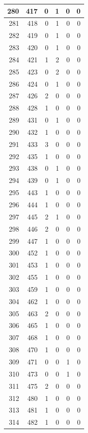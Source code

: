 \documentclass[
  letterpaper,
  DIV=11,
  numbers=noendperiod]{scrreprt}
\begin{document}
\begin{tabular}{r|r|r|r|r|r}
\hline
280 & 417 & 0 & 1 & 0 & 0\\
\hline
281 & 418 & 0 & 1 & 0 & 0\\
\hline
282 & 419 & 0 & 1 & 0 & 0\\
\hline
283 & 420 & 0 & 1 & 0 & 0\\
\hline
284 & 421 & 1 & 2 & 0 & 0\\
\hline
285 & 423 & 0 & 2 & 0 & 0\\
\hline
286 & 424 & 0 & 1 & 0 & 0\\
\hline
287 & 426 & 2 & 0 & 0 & 0\\
\hline
288 & 428 & 1 & 0 & 0 & 0\\
\hline
289 & 431 & 0 & 1 & 0 & 0\\
\hline
290 & 432 & 1 & 0 & 0 & 0\\
\hline
291 & 433 & 3 & 0 & 0 & 0\\
\hline
292 & 435 & 1 & 0 & 0 & 0\\
\hline
293 & 438 & 0 & 1 & 0 & 0\\
\hline
294 & 439 & 0 & 1 & 0 & 0\\
\hline
295 & 443 & 1 & 0 & 0 & 0\\
\hline
296 & 444 & 1 & 0 & 0 & 0\\
\hline
297 & 445 & 2 & 1 & 0 & 0\\
\hline
298 & 446 & 2 & 0 & 0 & 0\\
\hline
299 & 447 & 1 & 0 & 0 & 0\\
\hline
300 & 452 & 1 & 0 & 0 & 0\\
\hline
301 & 453 & 1 & 0 & 0 & 0\\
\hline
302 & 455 & 1 & 0 & 0 & 0\\
\hline
303 & 459 & 1 & 0 & 0 & 0\\
\hline
304 & 462 & 1 & 0 & 0 & 0\\
\hline
305 & 463 & 2 & 0 & 0 & 0\\
\hline
306 & 465 & 1 & 0 & 0 & 0\\
\hline
307 & 468 & 1 & 0 & 0 & 0\\
\hline
308 & 470 & 1 & 0 & 0 & 0\\
\hline
309 & 471 & 0 & 0 & 1 & 0\\
\hline
310 & 473 & 0 & 0 & 1 & 0\\
\hline
311 & 475 & 2 & 0 & 0 & 0\\
\hline
312 & 480 & 1 & 0 & 0 & 0\\
\hline
313 & 481 & 1 & 0 & 0 & 0\\
\hline
314 & 482 & 1 & 0 & 0 & 0\\

\end{tabular}
\end{document}
